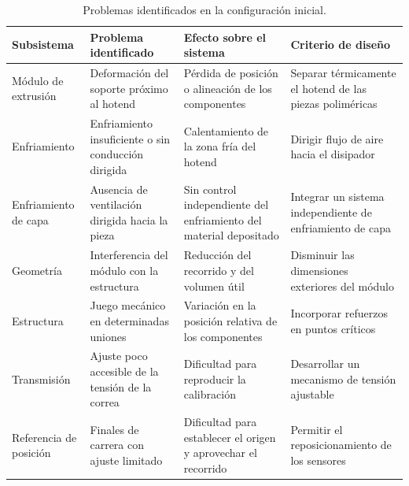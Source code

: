 \begin{table}[htbp]
    \centering
    \small
    \caption{Problemas identificados en la configuración inicial.}
    \label{tab:diagnostico_inicial}

    \begin{tabularx}{\textwidth}{
        >{\raggedright\arraybackslash}p{}
        Y
        Y
        Y
    }
        \toprule
        \textbf{Subsistema} &
        \textbf{Problema identificado} &
        \textbf{Efecto sobre el sistema} &
        \textbf{Criterio de diseño} \\
        \midrule

        Módulo de extrusión &
        Deformación del soporte próximo al hotend &
        Pérdida de posición o alineación de los componentes &
        Separar térmicamente el hotend de las piezas poliméricas \\

        \addlinespace

        Enfriamiento &
        Enfriamiento insuficiente o sin conducción dirigida &
        Calentamiento de la zona fría del hotend &
        Dirigir flujo de aire hacia el disipador \\

        \addlinespace

        Enfriamiento de capa &
        Ausencia de ventilación dirigida hacia la pieza &
        Sin control independiente del enfriamiento del material depositado &
        Integrar un sistema independiente de enfriamiento de capa \\

        \addlinespace

        Geometría &
        Interferencia del módulo con la estructura &
        Reducción del recorrido y del volumen útil &
        Disminuir las dimensiones exteriores del módulo \\

        \addlinespace

        Estructura &
        Juego mecánico en determinadas uniones &
        Variación en la posición relativa de los componentes &
        Incorporar refuerzos en puntos críticos \\

        \addlinespace

        Transmisión &
        Ajuste poco accesible de la tensión de la correa &
        Dificultad para reproducir la calibración &
        Desarrollar un mecanismo de tensión ajustable \\

        \addlinespace

        Referencia de posición &
        Finales de carrera con ajuste limitado &
        Dificultad para establecer el origen y aprovechar el recorrido &
        Permitir el reposicionamiento de los sensores \\

        \bottomrule
    \end{tabularx}

\end{table}


